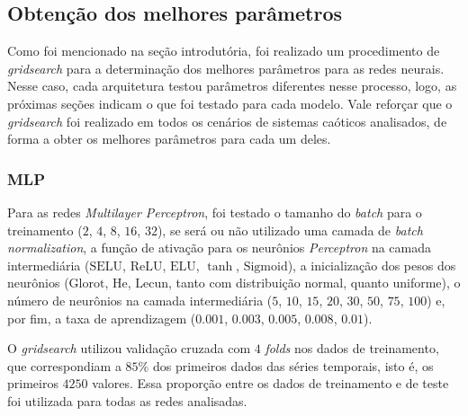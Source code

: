 \documentclass[9pt, technote]{article}
\newcommand{\sigmoid}{\text{Sigmoid}}
\newcommand{\selu}{\text{SELU}}
\newcommand{\relu}{\text{ReLU}}
\newcommand{\elu}{\text{ELU}}
\newcommand{\lecun}{\text{Lecun}}
\newcommand{\he}{\text{He}}
\newcommand{\glorot}{\text{Glorot}}
\begin{document}
\subsection{Obtenção dos melhores parâmetros}


Como foi mencionado na seção introdutória, foi realizado um procedimento de \textit{gridsearch} para a determinação dos melhores parâmetros para as redes neurais. Nesse caso, cada arquitetura testou parâmetros diferentes nesse processo, logo, as próximas seções indicam o que foi testado para cada modelo. Vale reforçar que o \textit{gridsearch} foi realizado em todos os cenários de sistemas caóticos analisados, de forma a obter os melhores parâmetros para cada um deles.

\subsubsection{MLP}

Para as redes \textit{Multilayer Perceptron}, foi testado o tamanho do \textit{batch} para o treinamento ($2$, $4$, $8$, $16$, $32$), se será ou não utilizado uma camada de \textit{batch normalization}, a função de ativação para os neurônios \textit{Perceptron} na camada intermediária ($\selu$, $\relu$, $\elu$, $\tanh$, $\sigmoid$), a inicialização dos pesos dos neurônios ($\glorot$, $\he$, $\lecun$, tanto com distribuição normal, quanto uniforme), o número de neurônios na camada intermediária ($5$, $10$, $15$, $20$, $30$, $50$, $75$, $100$) e, por fim, a taxa de aprendizagem ($0.001$, $0.003$, $0.005$, $0.008$, $0.01$). 

O \textit{gridsearch} utilizou validação cruzada com $4$ \textit{folds} nos dados de treinamento, que correspondiam a $85\%$ dos primeiros dados das séries temporais, isto é, os primeiros $4250$ valores. Essa proporção entre os dados de treinamento e de teste foi utilizada para todas as redes analisadas.
\end{document}
